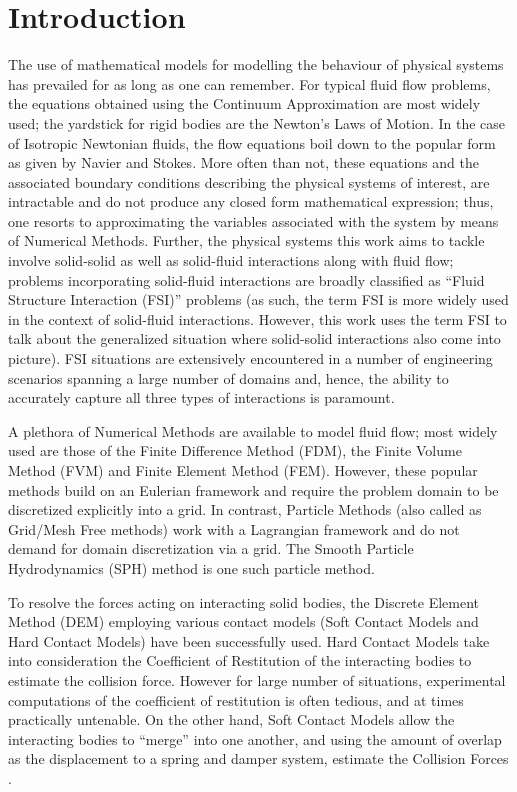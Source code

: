 \chapter{Introduction}

The use of mathematical models for modelling the behaviour of physical systems has prevailed for as long as one can remember. For typical fluid flow problems, the equations obtained using the Continuum Approximation are most widely used; the yardstick for rigid bodies are the Newton's Laws of Motion. In the case of Isotropic Newtonian fluids, the flow equations boil down to the popular form as given by Navier and Stokes. More often than not, these equations and the associated boundary conditions describing the physical systems of interest, are intractable and do not produce any closed form mathematical expression; thus, one resorts to approximating the variables associated with the system by means of Numerical Methods. Further, the physical systems this work aims to tackle involve solid-solid as well as solid-fluid interactions along with fluid flow; problems incorporating solid-fluid interactions are broadly classified as ``Fluid Structure Interaction (FSI)'' problems (as such, the term FSI is more widely used in the context of solid-fluid interactions. However, this work uses the term FSI to talk about the generalized situation where solid-solid interactions also come into picture). FSI situations are extensively encountered in a number of engineering scenarios spanning a large number of domains and, hence, the ability to accurately capture all three types of interactions is paramount.

A plethora of Numerical Methods are available to model fluid flow; most widely used are those of the Finite Difference Method (FDM), the Finite Volume Method (FVM) and Finite Element Method (FEM). However, these popular methods build on an Eulerian framework and require the problem domain to be discretized explicitly into a grid. In contrast, Particle Methods (also called as Grid/Mesh Free methods) work with a Lagrangian framework and do not demand for domain discretization via a grid. The Smooth Particle Hydrodynamics (SPH) method \cite{monaghan_intro} is one such particle method.

To resolve the forces acting on interacting solid bodies, the Discrete Element Method (DEM) employing various contact models (Soft Contact Models and Hard Contact Models) have been successfully used. Hard Contact Models take into consideration the Coefficient of Restitution of the interacting bodies to estimate the collision force. However for large number of situations, experimental computations of the coefficient of restitution is often tedious, and at times practically untenable. On the other hand, Soft Contact Models allow the interacting bodies to ``merge'' into one another, and using the amount of overlap as the displacement to a spring and damper system, estimate the Collision Forces \cite{mishra}.

